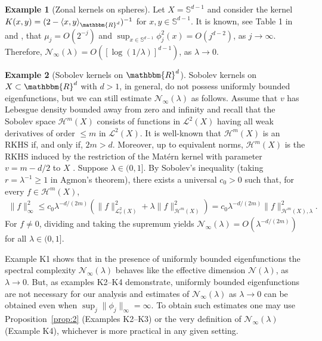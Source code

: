 \documentclass[11pt]{article}
\theoremstyle{definition}
\newtheorem{kernelexampleinner}{Example}
\newenvironment{kernelexample}
  {\begin{kernelexampleinner}}
  {\end{kernelexampleinner}}
\theoremstyle{remark}
\begin{document}
\begin{kernelexample}[Zonal kernels on spheres] Let $X = \mathbb{S}^{d-1}$ and consider the kernel $K(x,y) = (2-\langle x, y \rangle_{\mathbbm{R}^d})^{-1}$ for $x,y \in \mathbb{S}^{d-1}$. It is known, see Table 1 in \citep{S:2021} and \citep[Lemma 17.3 and Proposition 17.6]{Wend:2005}, that $\mu_j = O(2^{-j})$ and $\sup_{x \in \mathbb{S}^{d-1}} \phi_j^2(x) = O(j^{d-2})$, as $j \to \infty$. Therefore, $\mathcal{N}_{\infty} (\lambda) = O([\log(1/\lambda)]^{d-1})$, as $\lambda \to 0$.
\end{kernelexample}

\begin{kernelexample}[Sobolev kernels on $\mathbbm{R}^d$]

Sobolev kernels on $X \subset \mathbbm{R}^d$ with $d>1$, in general, do not possess uniformly bounded eigenfunctions, but we can still estimate $\mathcal{N}_{\infty}(\lambda)$ as follows. Assume that $v$ has Lebesgue density bounded away from zero and infinity and recall that the Sobolev space $\mathcal{H}^{m}(X)$ consists of functions in $\mathcal{L}^2(X)$ having all weak derivatives of order $\leq m$ in $\mathcal{L}^2(X)$. It is well-known that $\mathcal{H}^m(X)$ is an RKHS if, and only if, $2m>d$. Moreover, up to equivalent norms, $\mathcal{H}^m(X)$ is the RKHS induced by the restriction of the Mat\'ern kernel with parameter $v= m-d/2$ to $X$ \citep[see, e.g.][Corollary 10.48]{Wend:2005}. Suppose $\lambda \in (0,1]$. By Sobolev's inequality \citep[Theorem 3.9]{Agmon:1965} (taking $r = \lambda^{-1} \geq 1$ in Agmon's theorem), there exists a universal $c_0>0$ such that, for every $f \in \mathcal{H}^{m}(X)$,
\begin{align*}
\|f\|_{\infty}^2 \leq c_0 \lambda^{-d/(2m)}(\|f\|_{\mathcal{L}^2_v(X)}^2+\lambda \|f\|_{\mathcal{H}^m(X)}^2) = c_0 \lambda^{-d/(2m)} \|f\|_{\mathcal{H}^m(X), \lambda}^2.
\end{align*}
For $f \neq 0$, dividing and taking the supremum yields $\mathcal{N}_{\infty}(\lambda) = O(\lambda^{-d/(2m)})$ for all $\lambda \in (0,1]$.
\end{kernelexample}

Example K1 shows that in the presence of uniformly bounded eigenfunctions the spectral complexity $\mathcal{N}_{\infty}(\lambda)$ behaves like the effective dimension $\mathcal{N}(\lambda)$, as $\lambda \to 0$. But, as examples K2--K4 demonstrate, uniformly bounded eigenfunctions are not necessary for our analysis and estimates of $\mathcal{N}_{\infty}(\lambda)$ as $\lambda \to 0$ can be obtained even when $\sup_{j} \|\phi_j\|_{\infty} = \infty$. To obtain such estimates one may use Proposition~\ref{prop:2} (Examples K2--K3) or the very definition of $\mathcal{N}_{\infty}(\lambda)$ (Example K4), whichever is more practical in any given setting. 
\end{document}
